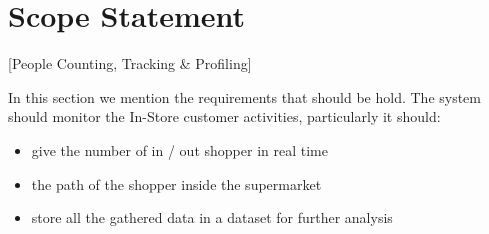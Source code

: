 \section{Scope Statement}
[People Counting, Tracking \& Profiling]

In this section we mention the requirements that should be hold. The system should monitor the In-Store customer activities, particularly it should:
\begin{itemize}
  \item give the number of in / out shopper in real time
  \item the path of the shopper inside the supermarket
  \item store all the gathered data in a dataset for further analysis
\end{itemize}